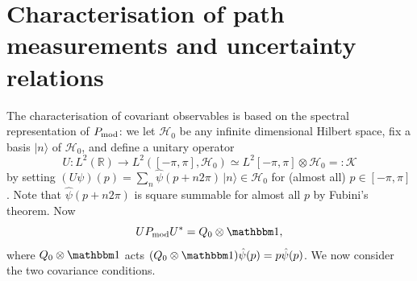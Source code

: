 

\section{Characterisation of path measurements and uncertainty relations}
The characterisation of covariant observables is based on the spectral representation of $P_{\mathrm{mod}}$: we let $\mathcal H_0$ be any infinite dimensional Hilbert space, fix a basis $|n\rangle$ of $\mathcal H_0$, and define a unitary operator
$$U:L^2(\mathbb R) \to L^2([-\pi,\pi],\mathcal H_0)\simeq L^2[-\pi,\pi]\otimes \mathcal H_0=:\mathcal K$$
by setting $(U\psi)(p) = \sum_{n} \hat\psi(p+n2\pi) \,|n\rangle\in \mathcal H_0$ for (almost all) $p\in [-\pi,\pi]$. Note that $\hat\psi(p+n2\pi)$ is square summable for almost all $p$ by Fubini's theorem. Now
$$
U\MOD P U^* = Q_0\otimes \id,
$$
where $Q_0\otimes \id$ acts $(Q_0\otimes \id)\hat\psi(p) = p\hat\psi(p)$. We now consider the two covariance conditions.

